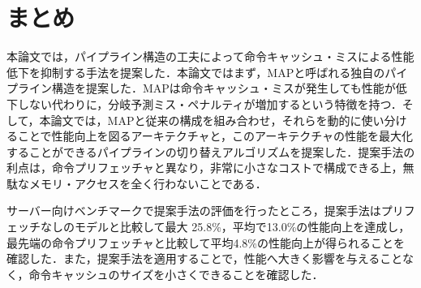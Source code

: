 
\chapter{まとめ}
\label{sec:summary}
本論文では，パイプライン構造の工夫によって命令キャッシュ・ミスによる性能低下を抑制する手法を提案した．本論文ではまず，MAPと呼ばれる独自のパイプライン構造を提案した．MAPは命令キャッシュ・ミスが発生しても性能が低下しない代わりに，分岐予測ミス・ペナルティが増加するという特徴を持つ．そして，本論文では，MAPと従来の構成を組み合わせ，それらを動的に使い分けることで性能向上を図るアーキテクチャと，このアーキテクチャの性能を最大化することができるパイプラインの切り替えアルゴリズムを提案した．提案手法の利点は，命令プリフェッチャと異なり，非常に小さなコストで構成できる上，無駄なメモリ・アクセスを全く行わないことである．

サーバー向けベンチマークで提案手法の評価を行ったところ，提案手法はプリフェッチなしのモデルと比較して最大 25.8\%，平均で13.0\%の性能向上を達成し，最先端の命令プリフェッチャと比較して平均4.8\%の性能向上が得られることを確認した．また，提案手法を適用することで，性能へ大きく影響を与えることなく，命令キャッシュのサイズを小さくできることを確認した．
